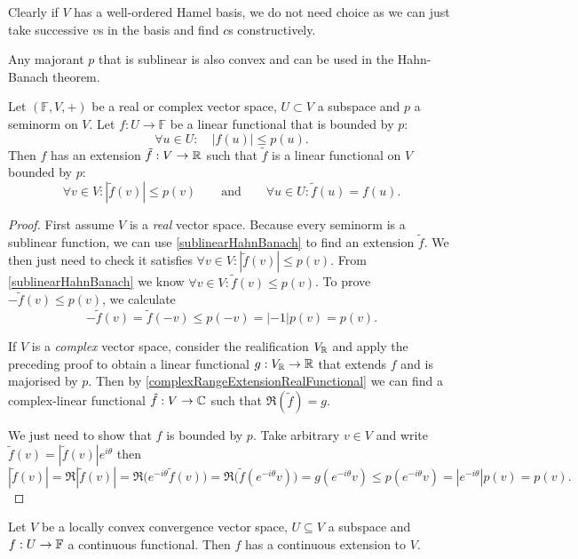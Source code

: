 Clearly if $V$ has a well-ordered Hamel basis, we do not need choice as we can just take successive $v$s in the basis and find $c$s constructively.
\begin{corollary} \label{sublinearHahnBanach}
Any majorant $p$ that is sublinear is also convex and can be used in the Hahn-Banach theorem.
\end{corollary}
\begin{corollary} \label{seminormHahnBanach}
Let $(\mathbb{F},V,+)$ be a real or complex vector space, $U\subset V$ a subspace and $p$ a seminorm on $V$. Let $f:U\to\mathbb{F}$ be a linear functional that is bounded by $p$:
\[ \forall u\in U: \quad |f(u)| \leq p(u). \]
Then $f$ has an extension $\tilde{f}: V\to \mathbb{R}$ such that $\tilde{f}$ is a linear functional on $V$ bounded by $p$:
\[ \forall v\in V: |\tilde{f}(v)| \leq p(v) \qquad \text{and} \qquad \forall u\in U: \tilde{f}(u) = f(u). \]
\end{corollary}
\begin{proof}
First assume $V$ is a \emph{real} vector space. Because every seminorm is a sublinear function, we can use \ref{sublinearHahnBanach} to find an extension $\tilde{f}$. We then just need to check it satisfies $\forall v\in V: |\tilde{f}(v)| \leq p(v)$.
From \ref{sublinearHahnBanach} we know $\forall v\in V: \tilde{f}(v) \leq p(v)$.
To prove $-\tilde{f}(v) \leq p(v)$, we calculate
\[ -\tilde{f}(v) = \tilde{f}(-v) \leq p(-v) = |-1|p(v) = p(v). \]

If $V$ is a \emph{complex} vector space, consider the realification $V_{\mathbb{R}}$ and apply the preceding proof to obtain a linear functional $g: V_{\mathbb{R}} \to \mathbb{R}$ that extends $f$ and is majorised by $p$. Then by \ref{complexRangeExtensionRealFunctional} we can find a complex-linear functional $\tilde{f}:V \to \mathbb{C}$ such that $\Re(\tilde{f}) = g$.

We just need to show that $f$ is bounded by $p$. Take arbitrary $v\in V$ and write $\tilde{f}(v) = |\tilde{f}(v)|e^{i\theta}$ then
\[ |\tilde{f}(v)| = \Re|\tilde{f}(v)| = \Re\Big(e^{-i\theta}\tilde{f}(v)\Big) = \Re\Big(\tilde{f}(e^{-i\theta}v)\Big) = g(e^{-i\theta}v) \leq p(e^{-i\theta}v) = |e^{-i\theta}|p(v) = p(v). \]
\end{proof}
\begin{corollary}
Let $V$ be a locally convex convergence vector space, $U\subseteq V$ a subspace and $f:U\to \mathbb{F}$ a continuous functional. Then $f$ has a continuous extension to $V$.
\end{corollary}
